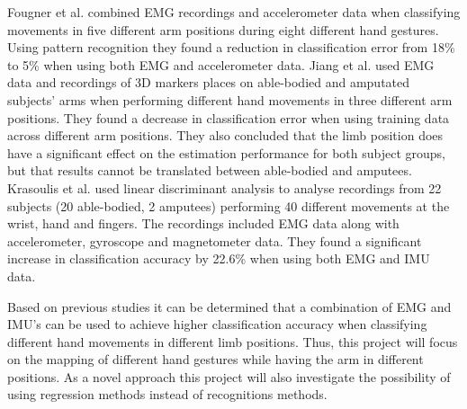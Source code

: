 Fougner et al. combined EMG recordings and accelerometer data when classifying movements in five different arm positions during eight different hand gestures. Using pattern recognition they found a reduction in classification error from 18\% to 5\% when using both EMG and accelerometer data. \cite{fougner2011} Jiang et al. used EMG data and recordings of 3D markers places on able-bodied and amputated subjects' arms when performing different hand movements in three different arm positions. They found a decrease in classification error when using training data across different arm positions. They also concluded that the limb position does have a significant effect on the estimation performance for both subject groups, but that results cannot be translated between able-bodied and amputees. \cite{Jiang2013} Krasoulis et al. used linear discriminant analysis to analyse recordings from 22 subjects (20 able-bodied, 2 amputees) performing 40 different movements at the wrist, hand and fingers. The recordings included EMG data along with accelerometer, gyroscope and magnetometer data. They found a significant increase in classification accuracy by 22.6\% when using both EMG and IMU data. \cite{Krasoulis2017} 

Based on previous studies it can be determined that a combination of EMG and IMU's can be used to achieve higher classification accuracy when classifying different hand movements in different limb positions. Thus, this project will focus on the mapping of different hand gestures while having the arm in different positions. As a novel approach this project will also investigate the possibility of using regression methods instead of recognitions methods.  





  	
  	
  	
  	